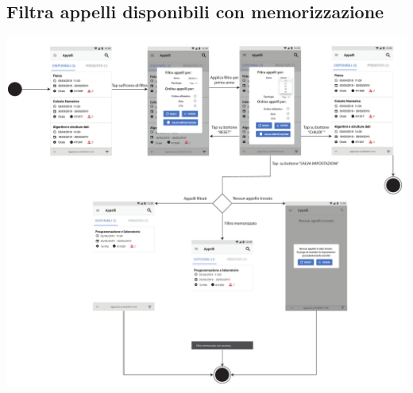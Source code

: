 
\subsection{Filtra appelli disponibili con memorizzazione }
\begin{center}
	\includegraphics[width=6in]{imgs/gruppo1/activity_diagrams/AD9_filtrati_appelli.pdf}
\end{center}
\newpage


